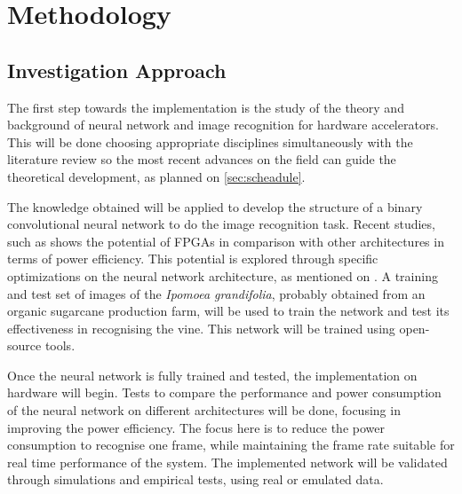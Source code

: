 \documentclass[
    12pt,                       %
    oneside,                    %
    a4paper,                    %
    brazil,                     %
    french,                     %
    spanish,                    %
    english,                    %
    ]{abntex2}
\begin{document}
\chapter[Methodology]{Methodology}
\section{Investigation Approach}

The first step towards the implementation is the study of the theory and background of neural network and image recognition for hardware accelerators. This will be done choosing appropriate disciplines simultaneously with the literature review so the most recent advances on the field can guide the theoretical development, as planned on \autoref{sec:scheadule}.

The knowledge obtained will be applied to develop the structure of a binary convolutional neural network to do the image recognition task. Recent studies, such as \textcite{Nurvitadhi2017_0} shows the potential of FPGAs in comparison with other architectures in terms of power efficiency. This potential is explored through specific optimizations on the neural network architecture, as mentioned on \textcites{Courbariaux2015, Zhang2017}. A training and test set of images of the \textit{Ipomoea grandifolia}, probably obtained from an organic sugarcane production farm, will be used to train the network and test its effectiveness in recognising the vine. This network will be trained using open-source tools.

Once the neural network is fully trained and tested, the implementation on hardware will begin. Tests to compare the performance and power consumption of the neural network on different architectures will be done, focusing in improving the power efficiency. The focus here is to reduce the power consumption to recognise one frame, while maintaining the frame rate suitable for real time performance of the system. The implemented network will be validated through simulations and empirical tests, using real or emulated data.

\end{document}
